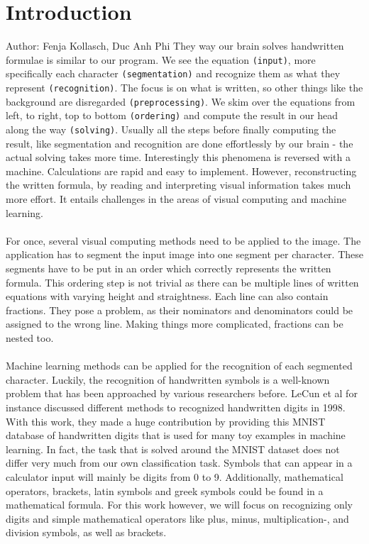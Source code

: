 \documentclass[12pt]{article}
\begin{document}
	\section{Introduction}
		\small{Author: Fenja Kollasch, Duc Anh Phi} \newline \newline
	They way our brain solves handwritten formulae is similar to our program. We see the equation \texttt{(input)}, more specifically each character \texttt{(segmentation)} and recognize them as what they represent \texttt{(recognition)}. The focus is on what is written, so other things like the background are disregarded \texttt{(preprocessing)}. We skim over the equations from left, to right, top to bottom \texttt{(ordering)} and compute the result in our head along the way \texttt{(solving)}. Usually all the steps before finally computing the result, like segmentation and recognition are done effortlessly by our brain - the actual solving takes more time. Interestingly this phenomena is reversed with a machine. Calculations are rapid and easy to implement. However, reconstructing the written formula, by reading and interpreting visual information takes much more effort. It entails challenges in the areas of visual computing and machine learning.\\\\
	For once, several visual computing methods need to be applied to the image. The application has to segment the input image into one segment per character. These segments have to be put in an order which correctly represents the written formula. This ordering step is not trivial as there can be multiple lines of written equations with varying height and straightness. Each line can also contain fractions. They pose a problem, as their nominators and denominators could be assigned to the wrong line. Making things more complicated, fractions can be nested too.\\\\
	Machine learning methods can be applied for the recognition of each segmented character. Luckily, the recognition of handwritten symbols is a well-known problem that has been approached by various researchers before. LeCun et al \cite{lecun1998} for instance discussed different methods to recognized handwritten digits in 1998. With this work, they made a huge contribution by providing this MNIST database of handwritten digits \cite{mnist} that is used for many toy examples in machine learning. In fact, the task that is solved around the MNIST dataset does not differ very much from our own classification task. Symbols that can appear in a calculator input will mainly be digits from 0 to 9. Additionally, mathematical operators, brackets, latin symbols and greek symbols could be found in a mathematical formula. For this work however, we will focus on recognizing only digits and simple mathematical operators like plus, minus, multiplication-, and division symbols, as well as brackets.\\\\
\end{document}
